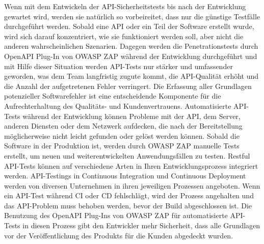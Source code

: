 Wenn mit dem Entwickeln der API-Sicherheitstests bis nach der Entwicklung gewartet wird, werden sie natürlich so vorbeireitet, dass nur die günstige Testfälle durchgeführt werden. Sobald eine API oder ein Teil der Software erstellt wurde, wird sich darauf konzentriert, wie sie funktioniert werden soll, aber nicht die anderen wahrscheinlichen Szenarien. Dagegen werden die Penetrationstests durch OpenAPI Plug-In von OWASP ZAP während der Entwicklung durchgeführt und mit Hilfe dieser Situation werden API-Tests nur stärker und umfassender geworden, was dem Team langfristig zugute kommt, die API-Qualität erhöht und die Anzahl der aufgetretenen Fehler verringert. Die Erfassung aller Grundlagen potenzieller Softwarefehler ist eine entscheidende Komponente für die Aufrechterhaltung des Qualitäts- und Kundenvertrauens. Automatisierte API-Tests während der Entwicklung können Probleme mit der API, dem Server, anderen Diensten oder dem Netzwerk aufdecken, die nach der Bereitstellung möglicherweise nicht leicht gefunden oder gelöst werden können. Sobald die Software in der Produktion ist, werden durch OWASP ZAP manuelle Tests erstellt, um neuen und weiterentwickelten Anwendungsfällen zu testen. Restful API-Tests können auf verschiedene Arten in Ihren Entwicklungsprozess integriert werden. API-Testings in Continuous Integration und Continuous Deployment werden von diversen Unternehmen in ihren jeweiligen Prozessen angeboten. Wenn ein API-Test während CI oder CD fehlschlägt, wird der Prozess angehalten und das API-Problem muss behoben werden, bevor der Build abgeschlossen ist. Die Benutzung des OpenAPI Plug-Ins von OWASP ZAP für automatisierte API-Tests in diesen Prozess gibt den Entwickler mehr Sicherheit, dass alle Grundlagen vor der Veröffentlichung des Produkts für die Kunden abgedeckt wurden\cite{restcaseapiimportance16}.
